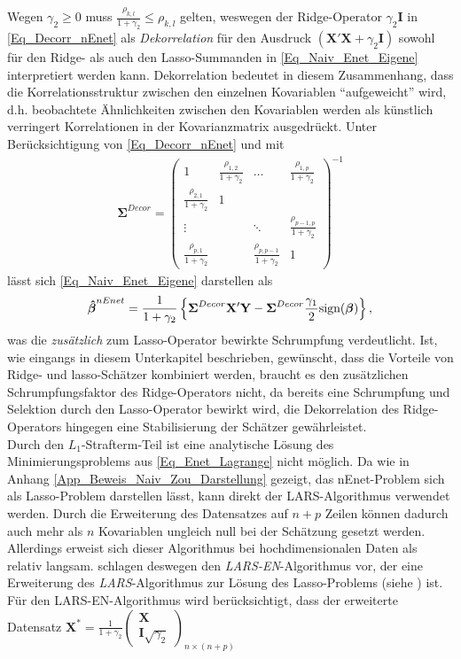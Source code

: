 \documentclass[12pt, a4paper]{report}\usepackage[]{graphicx}\usepackage[]{color}
\begin{document}
Wegen $\gamma_2 \geq 0$ muss $\frac{\rho_{k,l}}{1+\gamma_2} \leq \rho_{k,l}$ gelten, weswegen der Ridge-Operator $\gamma_2\mathbf{I}$ in \eqref{Eq_Decorr_nEnet} als \textit{Dekorrelation} für den Ausdruck $(\mathbf{X}'\mathbf{X}+\gamma_2\mathbf{I})$ sowohl für den Ridge- als auch den Lasso-Summanden in \eqref{Eq_Naiv_Enet_Eigene} interpretiert werden kann. Dekorrelation bedeutet in diesem Zusammenhang, dass die Korrelationsstruktur zwischen den einzelnen Kovariablen "`aufgeweicht"' wird, d.h. beobachtete Ähnlichkeiten zwischen den Kovariablen werden als künstlich verringert Korrelationen in der Kovarianzmatrix ausgedrückt.
Unter Berücksichtigung von \eqref{Eq_Decorr_nEnet} und mit
\begin{align*}
\boldsymbol{\Sigma}^{Decor}=\begin{pmatrix}
1 & \frac{\rho_{1,2}}{1+\gamma_2}&\dots&\frac{\rho_{1,p}}{1+\gamma_2} \\
\frac{\rho_{2,1}}{1+\gamma_2} & 1 &       &            \\
\vdots     &              & \ddots& \frac{\rho_{p-1,p}}{1+\gamma_2}\\
\frac{\rho_{p,1}}{1+\gamma_2} &              & \frac{\rho_{p, p-1}}{1+\gamma_2}& 1
\end{pmatrix}^{-1}
\end{align*}
lässt sich \eqref{Eq_Naiv_Enet_Eigene} darstellen als
\begin{align*}
\boldsymbol{\hat{\beta}}^{nEnet}=
\frac{1}{1+\gamma_2} \left\lbrace
\boldsymbol{\Sigma}^{Decor}\mathbf{X}'\mathbf{Y} - 
\boldsymbol{\Sigma}^{Decor}
\frac{\gamma_1}{2} \textnormal{sign}(\boldsymbol{\beta})
\right\rbrace,
\end{align*}
was die \textit{zusätzlich} zum Lasso-Operator bewirkte Schrumpfung verdeutlicht. Ist, wie eingangs in diesem Unterkapitel beschrieben, gewünscht, dass die Vorteile von Ridge- und lasso-Schätzer kombiniert werden, braucht es den zusätzlichen Schrumpfungsfaktor des Ridge-Operators nicht, da bereits eine Schrumpfung und Selektion durch den Lasso-Operator bewirkt wird, die Dekorrelation des Ridge-Operators hingegen eine Stabilisierung der Schätzer gewährleistet.\\
Durch den $L_1$-Strafterm-Teil ist eine analytische Lösung des Minimierungsproblems aus \eqref{Eq_Enet_Lagrange} nicht möglich. Da wie in Anhang \ref{App_Beweis_Naiv_Zou_Darstellung} gezeigt, das nEnet-Problem sich als Lasso-Problem darstellen lässt, kann direkt der LARS-Algorithmus verwendet werden. Durch die Erweiterung des Datensatzes auf $n+p$ Zeilen können dadurch auch mehr als $n$ Kovariablen ungleich null bei der Schätzung gesetzt werden. Allerdings erweist sich dieser Algorithmus bei hochdimensionalen Daten als relativ langsam.  schlagen deswegen den \textit{LARS-EN}-Algorithmus vor, der eine Erweiterung des \textit{LARS}-Algorithmus zur Lösung des Lasso-Problems (siehe ) ist. Für den LARS-EN-Algorithmus wird berücksichtigt, dass der erweiterte Datensatz $\mathbf{X}^*=\frac{1}{1+\gamma_2}\begin{pmatrix}
\mathbf{X}\\
\mathbf{I}\sqrt{\gamma_2}
\end{pmatrix}_{n \times (n+p)}$ 
\end{document}
